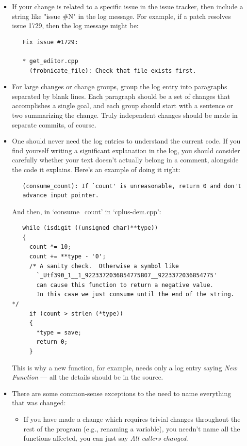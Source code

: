 \documentclass[headexclude,footexclude,12pt,BCOR0pt,DIV15]{scrartcl}
\begin{document}
\begin{itemize}
    \item If your change is related to a specific issue in the issue tracker,
        then include a string like "issue \#N" in the log message.  For
        example, if a patch resolves issue 1729, then the log message might
        be:
\begin{Verbatim}
   Fix issue #1729:

   * get_editor.cpp
     (frobnicate_file): Check that file exists first.
\end{Verbatim}

    \item For large changes or change groups, group the log entry into
        paragraphs separated by blank lines.  Each paragraph should be a set
        of changes that accomplishes a single goal, and each group should
        start with a sentence or two summarizing the change.  Truly
        independent changes should be made in separate commits, of course.

    \item One should never need the log entries to understand the current code.
        If you find yourself writing a significant explanation in the log, you
        should consider carefully whether your text doesn't actually belong in
        a comment, alongside the code it explains.  Here's an example of doing
        it right:
\begin{Verbatim}
   (consume_count): If `count' is unreasonable, return 0 and don't
   advance input pointer.
\end{Verbatim}
        And then, in `consume\_count' in `cplus-dem.cpp':
\begin{Verbatim}
   while (isdigit ((unsigned char)**type))
   {
     count *= 10;
     count += **type - '0';
     /* A sanity check.  Otherwise a symbol like
       `_Utf390_1__1_9223372036854775807__9223372036854775'
       can cause this function to return a negative value.
       In this case we just consume until the end of the string.  */
     if (count > strlen (*type))
     {
       *type = save;
       return 0;
     }
\end{Verbatim}
        This is why a new function, for example, needs only a log entry saying
        \emph{New Function} --- all the details should be in the source.

    \item There are some common-sense exceptions to the need to name everything
        that was changed:
        \begin{itemize}
        \item If you have made a change which requires trivial changes
          throughout the rest of the program (e.g., renaming a variable),
          you needn't name all the functions affected, you can just say
          \emph{All callers changed}.


\end{itemize}
\end{itemize}
\end{document}
